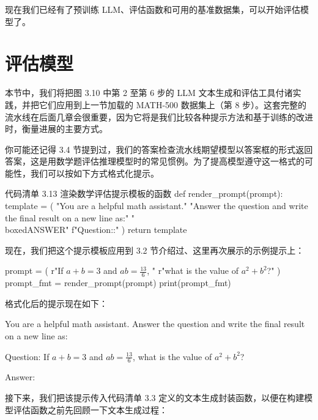 现在我们已经有了预训练 LLM、评估函数和可用的基准数据集，可以开始评估模型了。

\section{评估模型}

本节中，我们将把图 3.10 中第 2 至第 6 步的 LLM 文本生成和评估工具付诸实践，并把它们应用到上一节加载的 MATH-500 数据集上（第 8 步）。这套完整的流水线在后面几章会很重要，因为它将是我们比较各种提示方法和基于训练的改进时，衡量进展的主要方式。


你可能还记得 3.4 节提到过，我们的答案检查流水线期望模型以答案框的形式返回答案，这是用数学题评估推理模型时的常见惯例。为了提高模型遵守这一格式的可能性，我们可以按如下方式格式化提示。

\begin{codeboxt}{代码清单 3.13 渲染数学评估提示模板的函数}
def render_prompt(prompt):
    template = (
        "You are a helpful math assistant.\n"
        "Answer the question and write the final result on a new line as:\n"
        "\\boxed{ANSWER}\n\n"
        f"Question:\n\nAnswer:"
    )
    return template
\end{codeboxt}

现在，我们把这个提示模板应用到 3.2 节介绍过、这里再次展示的示例提示上：

\begin{codebox}
prompt = (
    r"If $a+b=3$ and $ab=\tfrac{13}{6}$, "
    r"what is the value of $a^2+b^2$?"
)
prompt_fmt = render_prompt(prompt)
print(prompt_fmt)
\end{codebox}

格式化后的提示现在如下：

\begin{codebox}
You are a helpful math assistant.
Answer the question and write the final result on a new line as:

Question:
If $a+b=3$ and $ab=\tfrac{13}{6}$, what is the value of $a^2+b^2$?

Answer:
\end{codebox}

接下来，我们把该提示传入代码清单 3.3 定义的文本生成封装函数，以便在构建模型评估函数之前先回顾一下文本生成过程：

